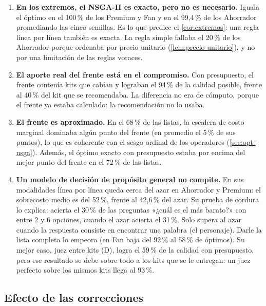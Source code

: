 \begin{enumerate}
  \item \textbf{En los extremos, el NSGA-II es exacto, pero no es
        necesario.} Iguala el óptimo en el 100\,\% de los Premium y Fan y en el
        99,4\,\% de los Ahorrador promediando las cinco semillas. Es lo que
        predice el \cref{cor:extremos}: una regla línea por línea también es
        exacta. La regla simple fallaba el 20\,\% de los Ahorrador porque
        ordenaba por precio unitario (\cref{lem:precio-unitario}), y no por una
        limitación de las reglas voraces.
  \item \textbf{El aporte real del frente está en el compromiso.} Con
        presupuesto, el frente contenía kits que cabían y lograban el 94\,\%
        de la calidad posible, frente al 40\,\% del kit que se recomendaba. La
        diferencia no era de cómputo, porque el frente ya estaba calculado: la
        recomendación no lo usaba.
  \item \textbf{El frente es aproximado.} En el 68\,\% de las listas, la
        escalera de costo marginal dominaba algún punto del frente (en
        promedio el 5\,\% de sus puntos), lo que es coherente con el sesgo
        ordinal de los operadores (\cref{sec:opt-nsga}). Además, el óptimo
        exacto con presupuesto estaba por encima del mejor punto del frente en
        el 72\,\% de las listas.
  \item \textbf{Un modelo de decisión de propósito general no compite.} En sus
        modalidades línea por línea queda cerca del azar en Ahorrador y
        Premium: el sobrecosto medio es del 52\,\%, frente al 42,6\,\% del azar.
        Su prueba de cordura lo explica: acierta el 30\,\% de las preguntas
        «¿cuál es el más barato?» con entre 2 y 6 opciones, cuando el azar
        acierta el 31\,\%. Solo supera al azar cuando la respuesta consiste en
        encontrar una palabra (el personaje). Darle la lista completa lo
        empeora (en Fan baja del 92\,\% al 58\,\% de óptimos). Su mejor caso,
        juez entre kits (D), logra el 59\,\% de la calidad con presupuesto,
        pero ese resultado se debe sobre todo a los kits que se le entregan: un
        juez perfecto sobre los mismos kits llega al 93\,\%.
\end{enumerate}

\subsection{Efecto de las correcciones}

